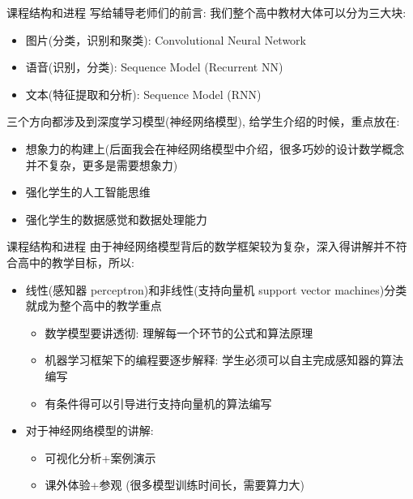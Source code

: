 \documentclass[handout]{beamer}
\begin{document}
\begin{frame}{课程结构和进程}
	写给辅导老师们的前言: 我们整个高中教材大体可以分为三大块:
	\begin{itemize}
	\setlength\itemsep{1em}
		\item 图片(分类，识别和聚类): Convolutional Neural Network
		\item 语音(识别，分类): Sequence Model (Recurrent NN)
		\item 文本(特征提取和分析): Sequence Model (RNN)
	\end{itemize}
	
	三个方向都涉及到深度学习模型(神经网络模型), 给学生介绍的时候，重点放在:
	
	\hfil
	\begin{itemize}
	\setlength\itemsep{1em}
		\item 想象力的构建上(后面我会在神经网络模型中介绍，很多巧妙的设计数学概念并不复杂，更多是需要想象力)
		\item 强化学生的人工智能思维
		\item 强化学生的数据感觉和数据处理能力
	\end{itemize}
\end{frame}

\begin{frame}{课程结构和进程}
由于神经网络模型背后的数学框架较为复杂，深入得讲解并不符合高中的教学目标，所以:

\hfill
\begin{itemize}
\setlength\itemsep{1em}
	\item 线性(感知器 perceptron)和非线性(支持向量机 support vector machines)分类就成为整个高中的教学重点 \begin{itemize}
	\setlength\itemsep{1em}
	\item 数学模型要讲透彻: 理解每一个环节的公式和算法原理
	\item 机器学习框架下的编程要逐步解释: 学生必须可以自主完成感知器的算法编写
	\item 有条件得可以引导进行支持向量机的算法编写
	\end{itemize}
	\item 对于神经网络模型的讲解: \begin{itemize}
	\setlength\itemsep{1em}
	\item 可视化分析+案例演示
	\item 课外体验+参观 (很多模型训练时间长，需要算力大)
	\end{itemize}
\end{itemize}	
\end{frame}
\end{document}
